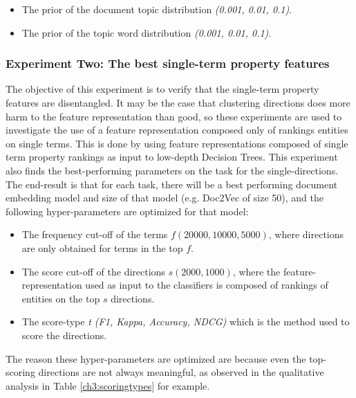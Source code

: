 \begin{itemize}
\item The prior of the document topic distribution \textit{ (0.001, 0.01, 0.1)}.
\item The prior of the topic word distribution \textit{ (0.001, 0.01, 0.1)}.
\end{itemize}


\subsubsection{Experiment Two: The best single-term property features}

The objective of this experiment is to verify that the single-term property features are disentangled. It may be the case that clustering directions does more harm to the feature representation than good, so these experiments are used to investigate the use of a feature representation composed only of rankings  entities on single terms. This is done  by using feature representations composed of single term property rankings as input to low-depth Decision Trees. This experiment also finds  the best-performing parameters on the task for the single-directions. The end-result is that for each task, there will be a best performing document embedding model and size of that model (e.g. Doc2Vec of size 50), and the following hyper-parameters are optimized for that model:

\begin{itemize}
	\item The frequency cut-off of the terms $f (20000, 10000, 5000) $, where directions are only obtained for terms in the top $f$.
	\item The score cut-off of the directions $s (2000, 1000)$, where the feature-representation used as input to the classifiers is composed of rankings of entities on the top $s$ directions.
	\item The score-type \textit{t ({F1}, {Kappa}, {Accuracy}, {NDCG})} which is the method used to score the directions.
\end{itemize}

The reason these hyper-parameters are optimized are because even the top-scoring directions are not always meaningful, as  observed in the qualitative analysis in Table \ref{ch3:scoringtypes} for example.





